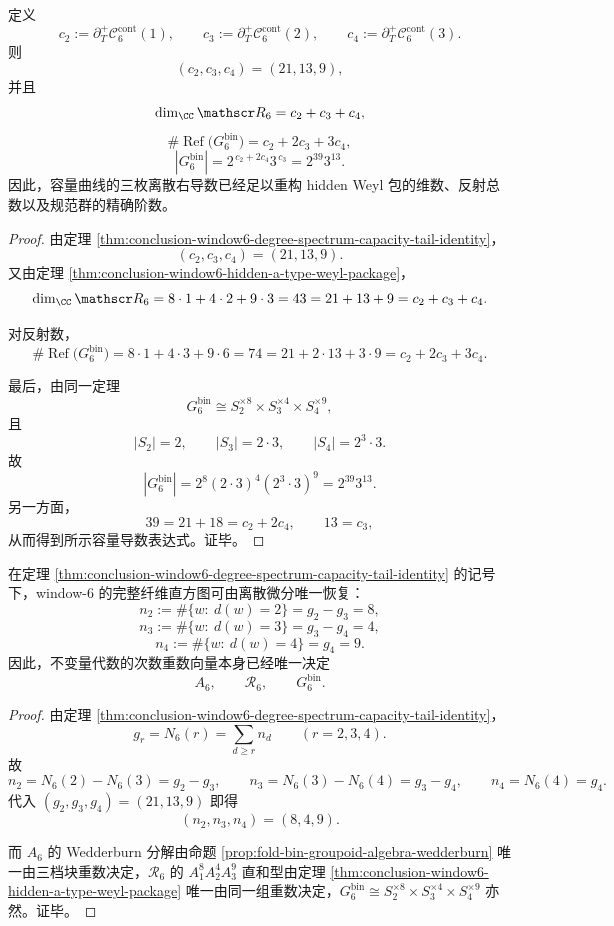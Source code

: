\begin{theorem}[容量导数对对称包的算术重构]\label{thm:conclusion-window6-capacity-derivatives-reconstruct-weyl-arithmetic}
定义
\[
c_2:=\partial_T^+\mathcal C_6^{\mathrm{cont}}(1),
\qquad
c_3:=\partial_T^+\mathcal C_6^{\mathrm{cont}}(2),
\qquad
c_4:=\partial_T^+\mathcal C_6^{\mathrm{cont}}(3).
\]
则
\[
(c_2,c_3,c_4)=(21,13,9),
\]
并且
\[
\dim_{\CC}\mathscr R_6=c_2+c_3+c_4,
\]
\[
\#\operatorname{Ref}\!\bigl(G_6^{\mathrm{bin}}\bigr)=c_2+2c_3+3c_4,
\]
\[
|G_6^{\mathrm{bin}}|
=
2^{\,c_2+2c_4}3^{\,c_3}
=
2^{39}3^{13}.
\]
因此，容量曲线的三枚离散右导数已经足以重构 hidden Weyl 包的维数、反射总数以及规范群的精确阶数。
\end{theorem}
\begin{proof}
由定理 \ref{thm:conclusion-window6-degree-spectrum-capacity-tail-identity}，
\[
(c_2,c_3,c_4)=(21,13,9).
\]
又由定理 \ref{thm:conclusion-window6-hidden-a-type-weyl-package}，
\[
\dim_{\CC}\mathscr R_6
=
8\cdot 1+4\cdot 2+9\cdot 3
=43
=21+13+9
=c_2+c_3+c_4.
\]

对反射数，
\[
\#\operatorname{Ref}\!\bigl(G_6^{\mathrm{bin}}\bigr)
=
8\cdot 1+4\cdot 3+9\cdot 6
=74
=21+2\cdot 13+3\cdot 9
=c_2+2c_3+3c_4.
\]

最后，由同一定理
\[
G_6^{\mathrm{bin}}
\cong
S_2^{\times 8}\times S_3^{\times 4}\times S_4^{\times 9},
\]
且
\[
|S_2|=2,\qquad
|S_3|=2\cdot 3,\qquad
|S_4|=2^3\cdot 3.
\]
故
\[
|G_6^{\mathrm{bin}}|
=
2^8(2\cdot 3)^4(2^3\cdot 3)^9
=
2^{39}3^{13}.
\]
另一方面，
\[
39=21+18=c_2+2c_4,
\qquad
13=c_3,
\]
从而得到所示容量导数表达式。证毕。
\end{proof}

\begin{corollary}[次数谱的离散微分恢复纤维直方图]\label{cor:conclusion-window6-degree-spectrum-discrete-differentiation-recovers-histogram}
在定理 \ref{thm:conclusion-window6-degree-spectrum-capacity-tail-identity} 的记号下，window-\(6\) 的完整纤维直方图可由离散微分唯一恢复：
\[
n_2:=\#\{w:\ d(w)=2\}=g_2-g_3=8,
\]
\[
n_3:=\#\{w:\ d(w)=3\}=g_3-g_4=4,
\]
\[
n_4:=\#\{w:\ d(w)=4\}=g_4=9.
\]
因此，不变量代数的次数重数向量本身已经唯一决定
\[
A_6,\qquad
\mathscr R_6,\qquad
G_6^{\mathrm{bin}}.
\]
\end{corollary}
\begin{proof}
由定理 \ref{thm:conclusion-window6-degree-spectrum-capacity-tail-identity}，
\[
g_r=N_6(r)=\sum_{d\ge r}n_d
\qquad (r=2,3,4).
\]
故
\[
n_2=N_6(2)-N_6(3)=g_2-g_3,
\qquad
n_3=N_6(3)-N_6(4)=g_3-g_4,
\qquad
n_4=N_6(4)=g_4.
\]
代入 \((g_2,g_3,g_4)=(21,13,9)\) 即得
\[
(n_2,n_3,n_4)=(8,4,9).
\]

而 \(A_6\) 的 Wedderburn 分解由命题 \ref{prop:fold-bin-groupoid-algebra-wedderburn} 唯一由三档块重数决定，\(\mathscr R_6\) 的 \(A_1^8A_2^4A_3^9\) 直和型由定理 \ref{thm:conclusion-window6-hidden-a-type-weyl-package} 唯一由同一组重数决定，\(G_6^{\mathrm{bin}}\cong S_2^{\times 8}\times S_3^{\times 4}\times S_4^{\times 9}\) 亦然。证毕。
\end{proof}

